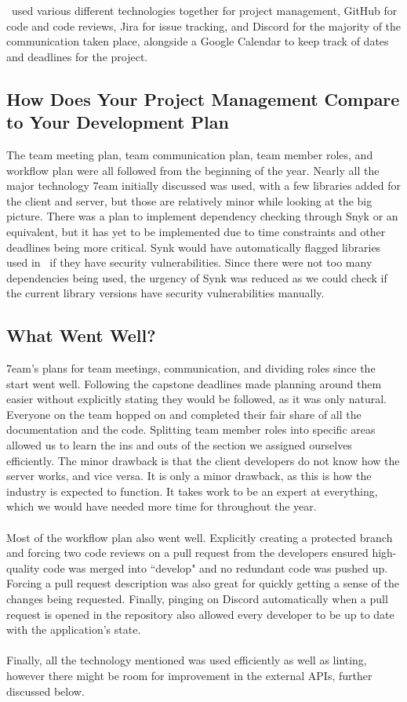 \documentclass{article}
\begin{document}
\noindent \progname ~used various different technologies together for project management, GitHub for code and code reviews, Jira for issue tracking, and Discord for the majority of the communication taken place, alongside a Google Calendar to keep track of dates and deadlines for the project.

\subsection{How Does Your Project Management Compare to Your Development Plan}

\noindent The team meeting plan, team communication plan, team member roles, and workflow plan were all followed from the beginning of the year. Nearly all the major technology 7eam initially discussed was used, with a few libraries added for the client and server, but those are relatively minor while looking at the big picture. There was a plan to implement dependency checking through Snyk or an equivalent, but it has yet to be implemented due to time constraints and other deadlines being more critical. Synk would have automatically flagged libraries used in \progname ~if they have security vulnerabilities. Since there were not too many dependencies being used, the urgency of Synk was reduced as we could check if the current library versions have security vulnerabilities manually.

\subsection{What Went Well?}

\noindent 7eam's plans for team meetings, communication, and dividing roles since the start went well. Following the capstone deadlines made planning around them easier without explicitly stating they would be followed, as it was only natural. Everyone on the team hopped on and completed their fair share of all the documentation and the code. Splitting team member roles into specific areas allowed us to learn the ins and outs of the section we assigned ourselves efficiently. The minor drawback is that the client developers do not know how the server works, and vice versa. It is only a minor drawback, as this is how the industry is expected to function. It takes work to be an expert at everything, which we would have needed more time for throughout the year.
\\~\\ Most of the workflow plan also went well. Explicitly creating a protected branch and forcing two code reviews on a pull request from the developers ensured high-quality code was merged into ``develop" and no redundant code was pushed up. Forcing a pull request description was also great for quickly getting a sense of the changes being requested. Finally, pinging on Discord automatically when a pull request is opened in the repository also allowed every developer to be up to date with the application's state.
\\~\\ Finally, all the technology mentioned was used efficiently as well as linting, however there might be room for improvement in the external APIs, further discussed below.
\end{document}
